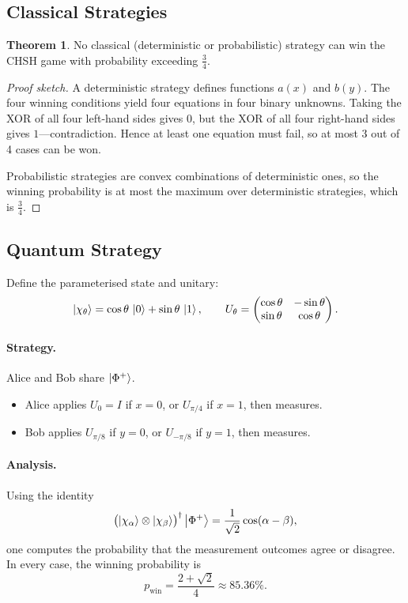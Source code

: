 \documentclass[11pt]{article}
\theoremstyle{definition}
\newtheorem{theorem}{Theorem}[section]
\begin{document}
\subsection{Classical Strategies}

\begin{theorem}
No classical (deterministic or probabilistic) strategy can win the CHSH game with probability exceeding $\frac{3}{4}$.
\end{theorem}

\begin{proof}[Proof sketch]
A deterministic strategy defines functions $a(x)$ and $b(y)$.  The four winning conditions yield four equations in four binary unknowns.  Taking the XOR of all four left-hand sides gives $0$, but the XOR of all four right-hand sides gives $1$---contradiction.  Hence at least one equation must fail, so at most 3 out of 4 cases can be won.

Probabilistic strategies are convex combinations of deterministic ones, so the winning probability is at most the maximum over deterministic strategies, which is $\tfrac{3}{4}$.
\end{proof}

\subsection{Quantum Strategy}

Define the parameterised state and unitary:
\[
    \ket{\chi_\theta} = \cos\theta\,\ket{0}+\sin\theta\,\ket{1},
    \qquad
    U_\theta = \begin{pmatrix}\cos\theta & -\sin\theta \\ \sin\theta & \cos\theta\end{pmatrix}.
\]

\paragraph{Strategy.}
Alice and Bob share $\ket{\Phi^+}$.
\begin{itemize}
    \item Alice applies $U_0=I$ if $x=0$, or $U_{\pi/4}$ if $x=1$, then measures.
    \item Bob applies $U_{\pi/8}$ if $y=0$, or $U_{-\pi/8}$ if $y=1$, then measures.
\end{itemize}

\paragraph{Analysis.}
Using the identity
\[
    \bigl(\ket{\chi_\alpha}\otimes\ket{\chi_\beta}\bigr)^\dagger\ket{\Phi^+}
    = \frac{1}{\sqrt{2}}\cos(\alpha-\beta),
\]
one computes the probability that the measurement outcomes agree or disagree.  In every case, the winning probability is
\[
    p_{\text{win}} = \frac{2+\sqrt{2}}{4} \approx 85.36\%.
\]
\end{document}
